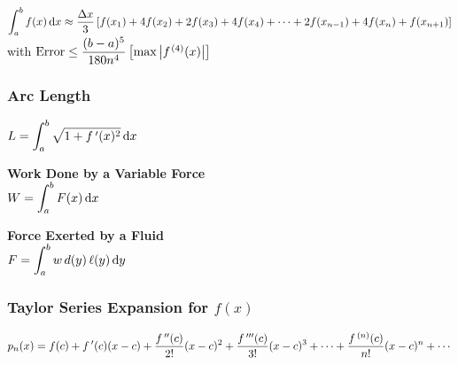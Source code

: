 \noindent$\displaystyle\int_a^b{f(x)}\operatorname{d}\! x \approx \frac{\Delta x}{3}\left[f(x_1)+4f(x_2) + 2f(x_3) + 4f(x_4) + \dotsb + 2f(x_{n-1}) + 4f(x_{n}) + f(x_{n+1})\right] 
$\smallskip\\
with $\text{Error} \leq \dfrac{(b-a)^5}{180n^4}\left[ \max \abs{f\primeskip^{(4)}(x)}\right]$

\vfill

\subsubsection*{Arc Length}

\noindent
$\displaystyle L = \int_a^b{\sqrt{1+ f\,'(x)^2}}\operatorname{d}\! x$

\vfill


\noindent
\begin{minipage}[t]{.5\linewidth}
  \textbf{Work Done by a Variable Force}\\\medskip
  $\displaystyle W = \int_a^b{F(x)}\operatorname{d}\! x$
\end{minipage}%
\begin{minipage}[t]{.5\linewidth}
 \textbf{Force Exerted by a Fluid}\\\medskip
 $\displaystyle F = \int_a^b{w\,d(y)\,\ell(y)}\operatorname{d}\! y$
\end{minipage}

\vfill

\subsubsection*{Taylor Series Expansion for $f(x)$}
\noindent$\displaystyle p_n(x) = f(c) + f\,'(c)(x-c) + \frac{f\,''(c)}{2!}(x-c)^2 + \frac{f\,'''(c)}{3!}(x-c)^3 + \dotsb + \frac{f\,^{(n)}(c)}{n!}(x-c)^n + \dotsb $

\vfill

